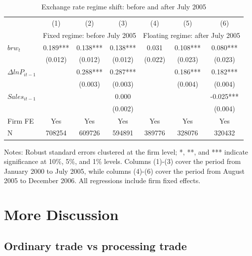 \begin{table}[htbp]
    \centering
    \caption{Exchange rate regime shift: before and after July 2005}
    \begin{threeparttable}
    \begin{tabular}{lcccccc}
        \toprule
        & (1)   & (2)   & (3)   & (4)   & (5)   & (6) \\
        & \multicolumn{3}{c}{Fixed regime: before July 2005} & \multicolumn{3}{c}{Floating regime: after July 2005}  \\
        \midrule
        $brw_t$   & 0.189*** & 0.138*** & 0.138*** & 0.031 & 0.108*** & 0.080*** \\
              & (0.012) & (0.012) & (0.012) & (0.022) & (0.023) & (0.023) \\
        $\Delta ln P_{it-1}$ &       & 0.288*** & 0.287*** &       & 0.186*** & 0.182*** \\
              &       & (0.003) & (0.003) &       & (0.004) & (0.004) \\
        $Sales_{it-1}$ &       &       & 0.000 &       &       & -0.025*** \\
              &       &       & (0.002) &       &       & (0.004) \\
        \midrule
        Firm FE & Yes   & Yes   & Yes   & Yes   & Yes   & Yes \\
        N     & 708254 & 609726 & 594891 & 389776 & 328076 & 320432 \\
        \bottomrule
    \end{tabular}
        \begin{tablenotes}
            \footnotesize
            \item Notes: Robust standard errors clustered at the firm level;  *, **, and *** indicate significance at 10\%, 5\%, and 1\% levels. Columns (1)-(3) cover the period from January 2000 to July 2005, while columns (4)-(6) cover the period from August 2005 to December 2006. All regressions include firm fixed effects.
	\end{tablenotes}
    \end{threeparttable}
    \label{tab.regime}
\end{table}

\newpage
\section{More Discussion}

\subsection{Ordinary trade vs processing trade}


